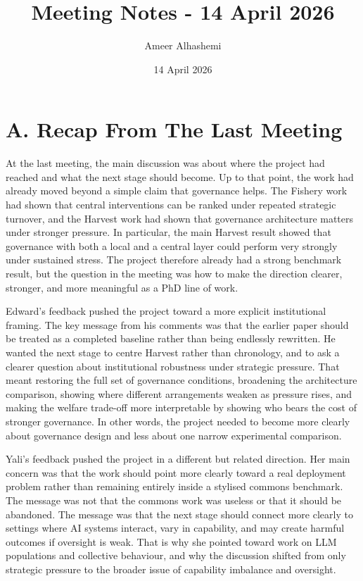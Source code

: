\documentclass[11pt]{article}
\title{Meeting Notes - 14 April 2026}
\author{Ameer Alhashemi}
\date{14 April 2026}
\begin{document}
\maketitle

\section*{A. Recap From The Last Meeting}

At the last meeting, the main discussion was about where the project had reached and what the next stage should become. Up to that point, the work had already moved beyond a simple claim that governance helps. The Fishery work had shown that central interventions can be ranked under repeated strategic turnover, and the Harvest work had shown that governance architecture matters under stronger pressure. In particular, the main Harvest result showed that governance with both a local and a central layer could perform very strongly under sustained stress. The project therefore already had a strong benchmark result, but the question in the meeting was how to make the direction clearer, stronger, and more meaningful as a PhD line of work.

Edward's feedback pushed the project toward a more explicit institutional framing. The key message from his comments was that the earlier paper should be treated as a completed baseline rather than being endlessly rewritten. He wanted the next stage to centre Harvest rather than chronology, and to ask a clearer question about institutional robustness under strategic pressure. That meant restoring the full set of governance conditions, broadening the architecture comparison, showing where different arrangements weaken as pressure rises, and making the welfare trade-off more interpretable by showing who bears the cost of stronger governance. In other words, the project needed to become more clearly about governance design and less about one narrow experimental comparison.

Yali's feedback pushed the project in a different but related direction. Her main concern was that the work should point more clearly toward a real deployment problem rather than remaining entirely inside a stylised commons benchmark. The message was not that the commons work was useless or that it should be abandoned. The message was that the next stage should connect more clearly to settings where AI systems interact, vary in capability, and may create harmful outcomes if oversight is weak. That is why she pointed toward work on LLM populations and collective behaviour, and why the discussion shifted from only strategic pressure to the broader issue of capability imbalance and oversight.
\end{document}
